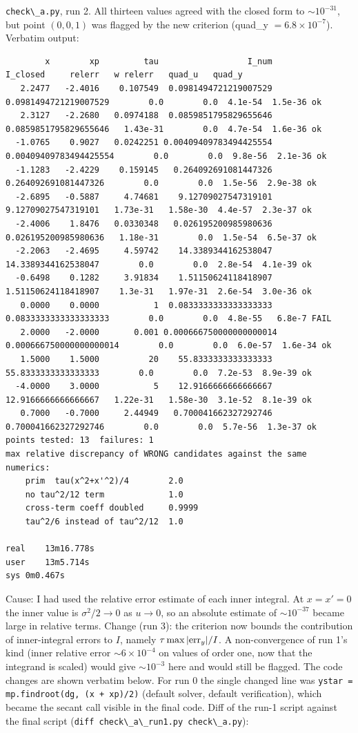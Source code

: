 \documentclass[11pt,a4paper]{article}
\newcommand{\passthrough}[1]{#1}
\begin{document}
\passthrough{\lstinline!check\_a.py!}, run 2. All thirteen values agreed
with the closed form to \(\sim10^{-31}\), but point \((0,0,1)\) was
flagged by the new criterion (quad\_y \(=6.8\times10^{-7}\)). Verbatim
output:

\begin{lstlisting}
        x        xp         tau                  I_num               I_closed     relerr   w relerr   quad_u   quad_y
   2.2477   -2.4016    0.107549  0.0981494721219007529  0.0981494721219007529        0.0        0.0  4.1e-54  1.5e-36 ok
   2.3127   -2.2680   0.0974188  0.0859851795829655646  0.0859851795829655646   1.43e-31        0.0  4.7e-54  1.6e-36 ok
  -1.0765    0.9027   0.0242251 0.00409409783494425554 0.00409409783494425554        0.0        0.0  9.8e-56  2.1e-36 ok
  -1.1283   -2.4229    0.159145   0.264092691081447326   0.264092691081447326        0.0        0.0  1.5e-56  2.9e-38 ok
  -2.6895   -0.5887     4.74681    9.12709027547319101    9.12709027547319101   1.73e-31   1.58e-30  4.4e-57  2.3e-37 ok
  -2.4006    1.8476   0.0330348   0.026195200985980636   0.026195200985980636   1.18e-31        0.0  1.5e-54  6.5e-37 ok
  -2.2063   -2.4695     4.59742    14.3389344162538047    14.3389344162538047        0.0        0.0  2.8e-54  4.1e-39 ok
  -0.6498    0.1282     3.91834    1.51150624118418907    1.51150624118418907    1.3e-31   1.97e-31  2.6e-54  3.0e-36 ok
   0.0000    0.0000           1  0.0833333333333333333  0.0833333333333333333        0.0        0.0  4.8e-55   6.8e-7 FAIL
   2.0000   -2.0000       0.001 0.000666750000000000014 0.000666750000000000014        0.0        0.0  6.0e-57  1.6e-34 ok
   1.5000    1.5000          20    55.8333333333333333    55.8333333333333333        0.0        0.0  7.2e-53  8.9e-39 ok
  -4.0000    3.0000           5    12.9166666666666667    12.9166666666666667   1.22e-31   1.58e-30  3.1e-52  8.1e-39 ok
   0.7000   -0.7000     2.44949   0.700041662327292746   0.700041662327292746        0.0        0.0  5.7e-56  1.3e-37 ok
points tested: 13  failures: 1
max relative discrepancy of WRONG candidates against the same numerics:
    prim  tau(x^2+x'^2)/4        2.0
    no tau^2/12 term             1.0
    cross-term coeff doubled     0.9999
    tau^2/6 instead of tau^2/12  1.0

real    13m16.778s
user    13m5.714s
sys 0m0.467s
\end{lstlisting}

Cause: I had used the relative error estimate of each inner integral. At
\(x=x'=0\) the inner value is \(\sigma^2/2\to0\) as \(u\to0\), so an
absolute estimate of \(\sim10^{-37}\) became large in relative terms.
Change (run 3): the criterion now bounds the contribution of
inner-integral errors to \(I\), namely \(\tau\max|{\rm err}_y|/I\). A
non-convergence of run 1's kind (inner relative error
\(\sim6\times10^{-4}\) on values of order one, now that the integrand is
scaled) would give \(\sim10^{-3}\) here and would still be flagged. The
code changes are shown verbatim below. For run 0 the single changed line
was \passthrough{\lstinline!ystar = mp.findroot(dg, (x + xp)/2)!}
(default solver, default verification), which became the secant call
visible in the final code. Diff of the run-1 script against the final
script (\passthrough{\lstinline!diff check\_a\_run1.py check\_a.py!}):
\end{document}
